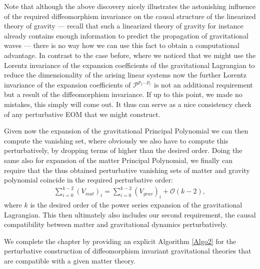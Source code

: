 Note that although the above discovery nicely illustrates the astonishing influence of the required diffeomorphism invariance on the causal structure of the linearized theory of gravity --- recall that such a linearized theory of gravity for instance already contains enough information to predict the propagation of gravitational waves --- there is no way how we can use this fact to obtain a computational advantage. In contrast to the case before, where we noticed that we might use the Lorentz invariance of the expansion coefficients of the gravitational Lagrangian to reduce the dimensionality of the arising linear systems now the further Lorentz invariance of the expansion coefficients of $\mathcal{P}^{p_1...p_r}$ is not an additional requirement but a result of the diffeomorphism invariance. If up to this point, we made no mistakes, this simply will come out. It thus can serve as a nice consistency check of any perturbative EOM that we might construct.

Given now the expansion of the gravitational Principal Polynomial we can then compute the vanishing set, where obviously we also have to compute this perturbatively, by dropping terms of higher than the desired order. Doing the same also for expansion of the matter Principal Polynomial, we finally can require that the thus obtained perturbative vanishing sets of matter and gravity polynomial coincide in the required perturbative order: 
\begin{align}
    \sum_{i=0}^{k-2} (V_{mat})_i = \sum _{i=0}^{k-2}(V_{grav})_i + \mathcal{O}(k-2),
\end{align}
where $k$ is the desired order of the power series expansion of the gravitational Lagrangian. This then ultimately also includes our second requirement, the causal compatibility between matter and gravitational dynamics perturbatively. 

We complete the chapter by providing an explicit Algorithm \ref{Algo2} for the perturbative construction of diffeomorphism invariant gravitational theories that are compatible with a given matter theory.

